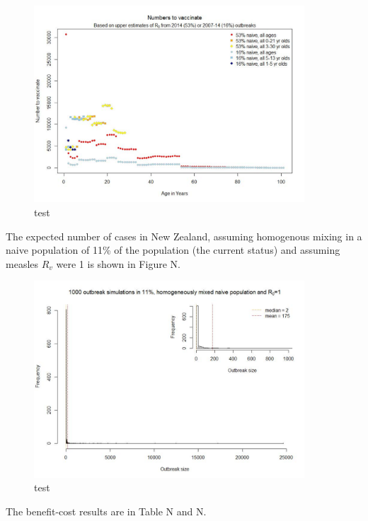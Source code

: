 \documentclass{article}
\begin{document}
\begin{figure}
     \centering
     \includegraphics[width=0.9\textwidth]{NumbersToVaccinate.pdf}
     \caption{test}
     \label{fig:numvacc}
\end{figure}

The expected number of cases in New Zealand, assuming homogenous mixing in a naive population of 11\% of the population (the current status) and assuming measles $R_v$ were 1 is shown in Figure N.

\begin{figure}
     \centering
     \includegraphics[width=0.9\textwidth]{simulations.pdf}
     \caption{test}
     \label{fig:sim}
\end{figure}

The benefit-cost results are in Table N and N.
\end{document}
